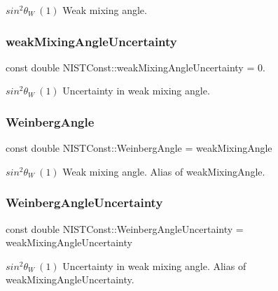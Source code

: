 $sin^2 \theta_W \ (1)$ Weak mixing angle. \mbox{\label{group___n_i_s_t_const-_weak_mixing_angle_ga6b461a8ed9af6322050586b5919cda98}} 
\subsubsection{\texorpdfstring{weak\+Mixing\+Angle\+Uncertainty}{weakMixingAngleUncertainty}}
{\footnotesize\ttfamily const double N\+I\+S\+T\+Const\+::weak\+Mixing\+Angle\+Uncertainty = 0.}

$sin^2 \theta_W \ (1)$ Uncertainty in weak mixing angle. \mbox{\label{group___n_i_s_t_const-_weak_mixing_angle_gaa27d3628b9e064d9d8d998be81b6adf0}} 
\subsubsection{\texorpdfstring{Weinberg\+Angle}{WeinbergAngle}}
{\footnotesize\ttfamily const double N\+I\+S\+T\+Const\+::\+Weinberg\+Angle = weak\+Mixing\+Angle}

$sin^2 \theta_W \ (1)$ Weak mixing angle. Alias of weak\+Mixing\+Angle. \mbox{\label{group___n_i_s_t_const-_weak_mixing_angle_ga923e5bc037fee920767800b7cc9ad724}} 
\subsubsection{\texorpdfstring{Weinberg\+Angle\+Uncertainty}{WeinbergAngleUncertainty}}
{\footnotesize\ttfamily const double N\+I\+S\+T\+Const\+::\+Weinberg\+Angle\+Uncertainty = weak\+Mixing\+Angle\+Uncertainty}

$sin^2 \theta_W \ (1)$ Uncertainty in weak mixing angle. Alias of weak\+Mixing\+Angle\+Uncertainty. 